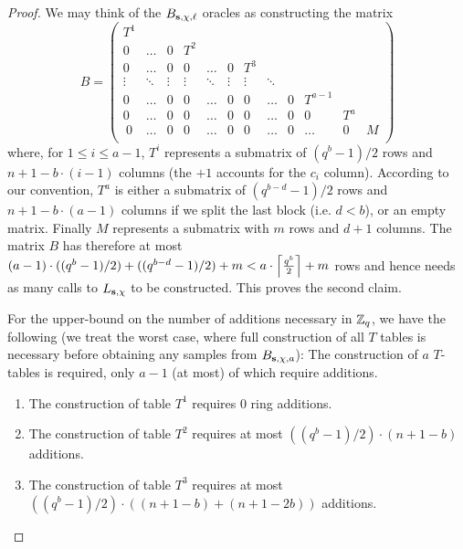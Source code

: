 \begin{proof}
We may think of the $B_{\mathbf{s},\chi,\ell}$ oracles as constructing the matrix 
\[
B = \left(\begin{array}{ccccccccccccc}
   T^1 &        &         &        &        &        & \\
 0     & \hdots &       0 &    T^2 &        &        &  \\
 0     & \hdots &       0 &      0 & \hdots & 0      &    T^3 &        &  \\
\vdots & \ddots &  \vdots & \vdots & \ddots & \vdots & \vdots & \ddots &  \\
 0     & \hdots &       0 &      0 & \hdots & 0      &      0 & \hdots & 0 & T^{a-1}\\
 0     & \hdots &       0 &      0 & \hdots & 0      &      0 & \hdots & 0 & 0 & T^{a}\\\
 0     & \hdots &       0 &      0 & \hdots & 0      &      0 & \hdots & 0 & \hdots & 0 & M\\
\end{array}\right)
\]
where, for $1 \leq i \leq a-1$, $T^i$ represents a submatrix of $(q^b-1)/2$ rows and 
$n+1 -b\cdot(i-1)$ columns (the $+1$ accounts for the $c_i$ column).
According to our convention, $T^a$ is either a submatrix of $(q^{b-d}-1)/2$ rows and 
$n+1 - b\cdot(a-1)$ columns if we split the last block (i.e. $d<b$), or an empty matrix.
Finally $M$ represents a submatrix with $m$ rows and $d + 1$ columns. 
The matrix $B$ has therefore at most $(a-1) \cdot ((q^b-1)/2) + ((q^{b-d}-1)/2) + m < a\cdot \left\lceil \frac{q^b}{2}\right\rceil + m$ 
rows and hence needs as many calls to $L_{\mathbf{s},\chi}$ to be constructed. This proves the second 
claim.

For the upper-bound on the number of additions necessary in $\mathbb{Z}_q$, we have the following (we treat the worst case, where full construction of all $T$ tables is necessary before obtaining any samples from $B_{\mathbf{s},\chi,a}$): The construction of $a$ $T$-tables is required, only $a-1$ (at most) of which require additions.
\begin{enumerate}

\item The construction of table $T^1$ requires $0$ ring additions.

\item The construction of table $T^2$ requires at most $((q^{b}-1)/2)\cdot(n+1 - b)$ additions.

\item The construction of table $T^3$ requires at most $((q^{b}-1)/2)\cdot ((n+1 - b) + (n+1 - 2b) )$ additions.


\end{enumerate}
\end{proof}
